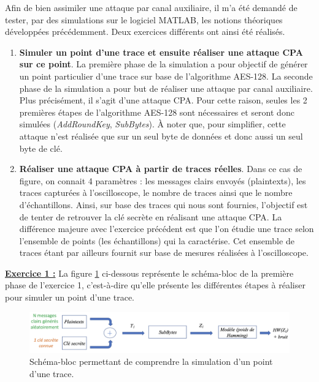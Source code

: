 \documentclass[oneside]{book}
\begin{document}
Afin de bien assimiler une attaque par canal auxiliaire, il m'a été demandé de tester, par des simulations sur le logiciel MATLAB, les notions théoriques développées précédemment. Deux exercices différents ont ainsi été réalisés. 
\begin{enumerate}
\item \textbf{Simuler un point d'une trace et ensuite réaliser une attaque CPA sur ce point}. La première phase de la simulation a pour objectif de générer un point particulier d'une trace sur base de l'algorithme AES-128. La seconde phase de la simulation a pour but de réaliser une attaque par canal auxiliaire. Plus précisément, il s'agit d'une attaque CPA. Pour cette raison, seules les 2 premières étapes de l'algorithme AES-128 sont nécessaires et seront donc simulées (\textit{AddRoundKey}, \textit{SubBytes}). À noter que, pour simplifier, cette attaque n'est réalisée que sur un seul byte de données et donc aussi un seul byte de clé.
\item \textbf{Réaliser une attaque CPA à partir de traces réelles}. Dans ce cas de figure, on connait 4 paramètres : les messages clairs envoyés (plaintexts), les traces capturées à l'oscilloscope, le nombre de traces ainsi que le nombre d'échantillons. Ainsi, sur base des traces qui nous sont fournies, l'objectif est de tenter de retrouver la clé secrète en réalisant une attaque CPA. La différence majeure avec l'exercice précédent est que l'on étudie une trace selon l'ensemble de points (les échantillons) qui la caractérise. Cet ensemble de traces étant par ailleurs fournit sur base de mesures réalisées à l'oscilloscope. \\
\end{enumerate}

\hspace{-0.5 cm}\textbf{\underline{Exercice 1 :}} La figure \ref{fig:simul1} ci-dessous représente le schéma-bloc de la première phase de l'exercice 1, c'est-à-dire qu'elle présente les différentes étapes à réaliser pour simuler un point d'une trace.
\begin{figure}[htbp]
    \centering
    \includegraphics[scale=0.45]{image/simul1}
    \caption{Schéma-bloc permettant de comprendre la simulation d'un point d'une trace.}
    \label{fig:simul1} 
\end{figure}
\end{document}

